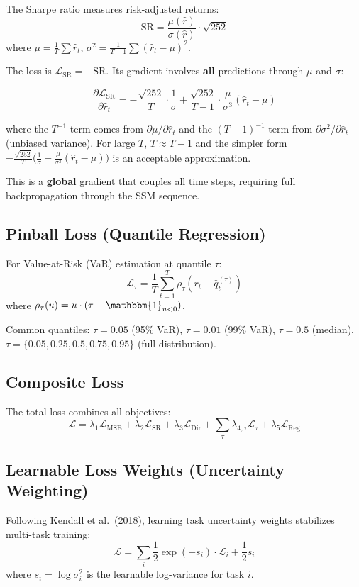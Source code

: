\documentclass[11pt,a4paper]{article}
\newcommand{\loss}{\mathcal{L}}
\newcommand{\ind}{\mathbbm{1}}
\begin{document}
The Sharpe ratio measures risk-adjusted returns:
\[
\text{SR} = \frac{\mu(\hat{r})}{\sigma(\hat{r})} \cdot \sqrt{252}
\]
where $\mu = \frac{1}{T}\sum \hat{r}_t$, $\sigma^2 = \frac{1}{T-1}\sum (\hat{r}_t - \mu)^2$.

The loss is $\loss_{\text{SR}} = -\text{SR}$. Its gradient involves \textbf{all}
predictions through $\mu$ and $\sigma$:

\[
\frac{\partial \loss_{\text{SR}}}{\partial \hat{r}_t} = -\frac{\sqrt{252}}{T} \cdot \frac{1}{\sigma} + \frac{\sqrt{252}}{T-1} \cdot \frac{\mu}{\sigma^3} (\hat{r}_t - \mu)
\]

where the $T^{-1}$ term comes from $\partial\mu/\partial\hat{r}_t$ and the
$(T-1)^{-1}$ term from $\partial\sigma^2/\partial\hat{r}_t$ (unbiased variance).
For large $T$, $T \approx T-1$ and the simpler form $-\frac{\sqrt{252}}{T}
\bigl(\frac{1}{\sigma} - \frac{\mu}{\sigma^3}(\hat{r}_t - \mu)\bigr)$ is an
acceptable approximation.

This is a \textbf{global} gradient that couples all time steps, requiring
full backpropagation through the SSM sequence.

\subsection{Pinball Loss (Quantile Regression)}

For Value-at-Risk (VaR) estimation at quantile $\tau$:
\[
\loss_{\tau} = \frac{1}{T} \sum_{t=1}^{T} \rho_\tau(r_t - \hat{q}_t^{(\tau)})
\]
where $\rho_\tau(u) = u \cdot (\tau - \ind_{u < 0})$.

Common quantiles: $\tau = 0.05$ (95\% VaR), $\tau = 0.01$ (99\% VaR),
$\tau = 0.5$ (median), $\tau = \{0.05, 0.25, 0.5, 0.75, 0.95\}$ (full distribution).

\subsection{Composite Loss}

The total loss combines all objectives:
\[
\loss = \lambda_1 \loss_{\text{MSE}} + \lambda_2 \loss_{\text{SR}} + \lambda_3 \loss_{\text{Dir}} + \sum_{\tau} \lambda_{4,\tau} \loss_\tau + \lambda_5 \loss_{\text{Reg}}
\]

\subsection{Learnable Loss Weights (Uncertainty Weighting)}

Following Kendall et al.\ (2018), learning task uncertainty weights stabilizes
multi-task training:
\[
\loss = \sum_i \frac{1}{2} \exp(-s_i) \cdot \loss_i + \frac{1}{2} s_i
\]
where $s_i = \log \sigma_i^2$ is the learnable log-variance for task $i$.
\end{document}
